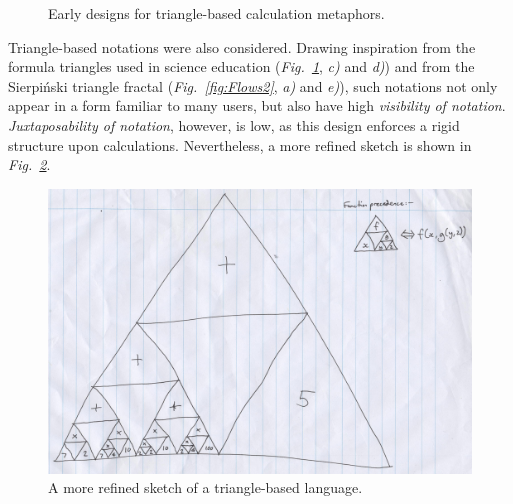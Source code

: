 \documentclass[12pt,twoside,notitlepage,xetex]{report}
\begin{document}
\begin{center}
\begin{figure}[H]
\begin{center}
{{\begin{center}
\end{center}}}
\end{center}
\caption{Early designs for triangle-based calculation metaphors.}
\label{fig:Tris1}
\end{figure}
\end{center}

Triangle-based notations were also considered.  Drawing inspiration from the formula triangles used in science education (\emph{Fig.~\ref{fig:Tris1}}, \emph{c)} and \emph{d)}) and from the Sierpiński triangle fractal (\emph{Fig.~\ref{fig:Flows2}}, \emph{a)} and \emph{e)}), such notations not only appear in a form familiar to many users, but also have high \emph{visibility of notation}.  \emph{Juxtaposability of notation}, however, is low, as this design enforces a rigid structure upon calculations.  Nevertheless, a more refined sketch is shown in \emph{Fig.~\ref{fig:Tris2}}.

\begin{center}
\begin{figure}
\begin{center}
\includegraphics[width=\textwidth]{figs/mockups/sketches/31/31a.jpg}
\end{center}
\caption{A more refined sketch of a triangle-based language.}
\label{fig:Tris2}
\end{figure}
\end{center}
\end{document}
